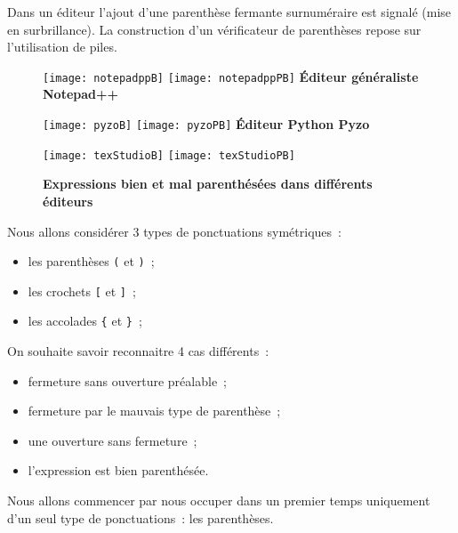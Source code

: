 Dans un éditeur l'ajout d'une parenthèse fermante surnuméraire est signalé (mise en surbrillance). La construction d'un vérificateur de parenthèses repose sur l'utilisation de piles.

\begin{figure}[hbt]
	\begin{center}
		\begin{minipage}{0.32\textwidth}
			\centering
			\texttt{[image: notepadppB]}
			\texttt{[image: notepadppPB]}
			\textbf{Éditeur généraliste Notepad++}
		\end{minipage}
		\begin{minipage}[t]{0.32\textwidth}
			\centering
			\texttt{[image: pyzoB]}
			\texttt{[image: pyzoPB]}
			\textbf{Éditeur Python Pyzo}
		\end{minipage}
		\begin{minipage}[t]{0.32\textwidth}
			\centering
			\texttt{[image: texStudioB]}
			\texttt{[image: texStudioPB]}
		\end{minipage}
		\textbf{Expressions bien et mal parenthésées dans différents éditeurs}
	\end{center}
\end{figure}

Nous allons considérer 3 types de ponctuations symétriques~: 
\begin{itemize}
	\item les parenthèses \texttt{(} et \texttt{)}~; 
	\item les crochets \texttt{[} et \texttt{]}~; 
	\item les accolades \texttt{\{} et \texttt{\}}~; 
\end{itemize}

On souhaite savoir reconnaitre 4 cas différents~: 
\begin{itemize}
	\item fermeture sans ouverture préalable~; 
	\item fermeture par le mauvais type de parenthèse~; 
	\item une ouverture sans fermeture~; 
	\item l'expression est bien parenthésée. 
\end{itemize}

Nous allons commencer par nous occuper dans un premier temps uniquement d'un seul type de ponctuations~: les parenthèses. 

